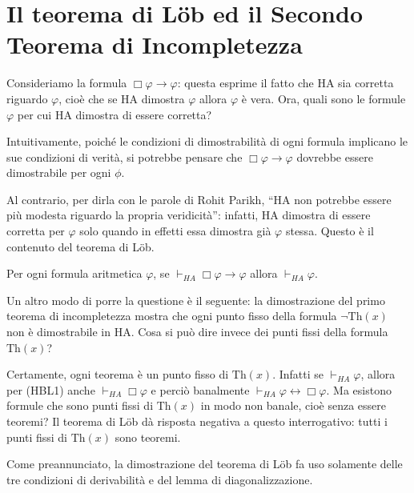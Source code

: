 \section{Il teorema di L\"ob ed il Secondo Teorema di Incompletezza}

\noindent Consideriamo la formula $\Box\varphi\to\varphi$: questa esprime il fatto che HA sia corretta riguardo $\varphi$, cioè che se HA dimostra $\varphi$ allora $\varphi$ è vera. Ora, quali sono le formule $\varphi$ per cui HA dimostra di essere corretta?

Intuitivamente, poiché le condizioni di dimostrabilità di ogni formula implicano le sue condizioni di verità, si potrebbe pensare che $\Box\varphi\to\varphi$ dovrebbe essere dimostrabile per ogni $\phi$.

Al contrario, per dirla con le parole di Rohit Parikh, ``HA non potrebbe essere più modesta riguardo la propria veridicità'': infatti, HA dimostra di essere corretta per $\varphi$ solo quando in effetti essa dimostra già $\varphi$ stessa. Questo è il contenuto del teorema di L\"ob.

\begin{thm}[Teorema di L\"ob]
Per ogni formula aritmetica $\varphi$, se $\vdash_{HA}\Box\varphi\to\varphi$ allora $\vdash_{HA}\varphi$.
\end{thm}

\noindent Un altro modo di porre la questione è il seguente: la dimostrazione del primo teorema di incompletezza mostra che ogni punto fisso della formula $\neg\ensuremath{\mathrm{Th}}(x)$ non è dimostrabile in HA. Cosa si può dire invece dei punti fissi della formula $\ensuremath{\mathrm{Th}}(x)$?

Certamente, ogni teorema è un punto fisso di $\ensuremath{\mathrm{Th}}(x)$. Infatti se $\vdash_{HA}\varphi$, allora per (HBL1) anche $\vdash_{HA}\Box\varphi$ e perciò banalmente $\vdash_{HA}\varphi\leftrightarrow\Box\varphi$. Ma esistono formule che sono punti fissi di $\ensuremath{\mathrm{Th}}(x)$ in modo non banale, cioè senza essere teoremi? Il teorema di L\"ob dà risposta negativa a questo interrogativo: tutti i punti fissi di $\ensuremath{\mathrm{Th}}(x)$ sono teoremi.

Come preannunciato, la dimostrazione del teorema di L\"ob fa uso solamente delle tre condizioni di derivabilità e del lemma di diagonalizzazione.

